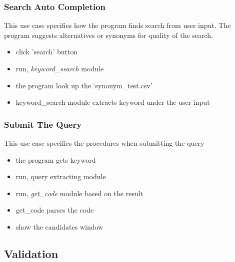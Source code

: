 \documentclass[conference]{IEEEtran}
\begin{document}
\subsubsection{Search Auto Completion}
This use case specifies how the program finds search from user input. The program suggests alternatives or synonyms for quality of the search.
\begin{itemize}
  \item click 'search' button
  \item run, \textit{keyword\_search} module
  \item the program look up the `synonym\_test.csv'
  \item keyword\_search module extracts keyword under the user input
\end{itemize}
\textit{}

\subsubsection{Submit The Query}
This use case specifies the procedures when submitting the query
\begin{itemize}
  \item the program gets keyword
  \item run, query extracting module
  \item run, \textit{get\_code} module based on the result
  \item get\_code parses the code
  \item show the candidates window
\end{itemize}
\textit{}

\subsection{Validation}
\end{document}
